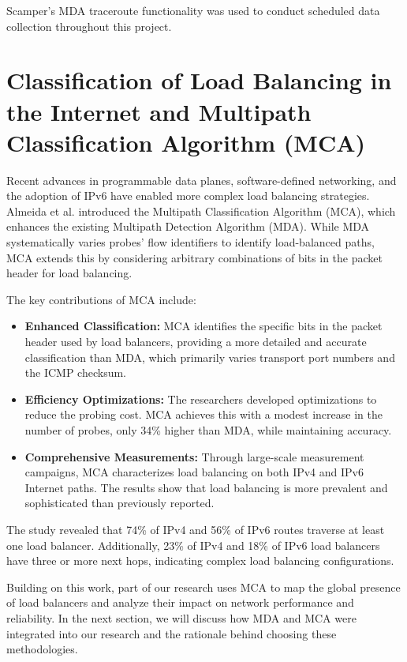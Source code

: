\documentclass[12pt]{cwru_thesis}
\begin{document}
Scamper's MDA traceroute functionality was used to conduct scheduled data collection throughout this project.

\section{Classification of Load Balancing in the Internet and Multipath Classification Algorithm (MCA)}

Recent advances in programmable data planes, software-defined networking, and the adoption of IPv6 have enabled more complex load balancing strategies. Almeida et al. introduced the Multipath Classification Algorithm (MCA), which enhances the existing Multipath Detection Algorithm (MDA). While MDA systematically varies probes' flow identifiers to identify load-balanced paths, MCA extends this by considering arbitrary combinations of bits in the packet header for load balancing.

The key contributions of MCA include:
\begin{itemize}
    \item \textbf{Enhanced Classification:} MCA identifies the specific bits in the packet header used by load balancers, providing a more detailed and accurate classification than MDA, which primarily varies transport port numbers and the ICMP checksum.
    \item \textbf{Efficiency Optimizations:} The researchers developed optimizations to reduce the probing cost. MCA achieves this with a modest increase in the number of probes, only 34\% higher than MDA, while maintaining accuracy.
    \item \textbf{Comprehensive Measurements:} Through large-scale measurement campaigns, MCA characterizes load balancing on both IPv4 and IPv6 Internet paths. The results show that load balancing is more prevalent and sophisticated than previously reported.
\end{itemize}

The study revealed that 74\% of IPv4 and 56\% of IPv6 routes traverse at least one load balancer. Additionally, 23\% of IPv4 and 18\% of IPv6 load balancers have three or more next hops, indicating complex load balancing configurations.

Building on this work, part of our research uses MCA to map the global presence of load balancers and analyze their impact on network performance and reliability. In the next section, we will discuss how MDA and MCA were integrated into our research and the rationale behind choosing these methodologies.
\end{document}
